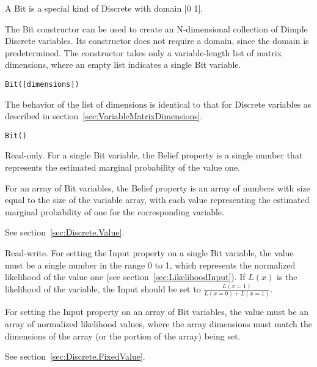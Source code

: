 A Bit is a special kind of Discrete with domain [0 1].



\ifmatlab
The Bit constructor can be used to create an N-dimensional collection of Dimple Discrete variables.  Its constructor does not require a domain, since the domain is predetermined.  The constructor takes only a variable-length list of matrix dimensions, where an empty list indicates a single Bit variable.

\begin{lstlisting}
Bit([dimensions])
\end{lstlisting}

The behavior of the list of dimensions is identical to that for Discrete variables as described in section~\ref{sec:VariableMatrixDimensions}.

\fi

\ifjava
\begin{lstlisting}
Bit()
\end{lstlisting}
\fi



Read-only.  For a single Bit variable, the Belief property is a single number that represents the estimated marginal probability of the value one.

For an array of Bit variables, the Belief property is an array of numbers with size equal to the size of the variable array, with each value representing the estimated marginal probability of one for the corresponding variable.


See section~\ref{sec:Discrete.Value}.


Read-write.  For setting the Input property on a single Bit variable, the value must be a single number in the range 0 to 1, which represents the normalized likelihood of the value one (see section~\ref{sec:LikelihoodInput}).  If $L(x)$ is the likelihood of the variable, the Input should be set to $\frac{L(x=1)}{L(x=0) + L(x=1)}$.

For setting the Input property on an array of Bit variables, the value must be an array of normalized likelihood values, where the array dimensions must match the dimensions of the array (or the portion of the array) being set.



See section~\ref{sec:Discrete.FixedValue}.


